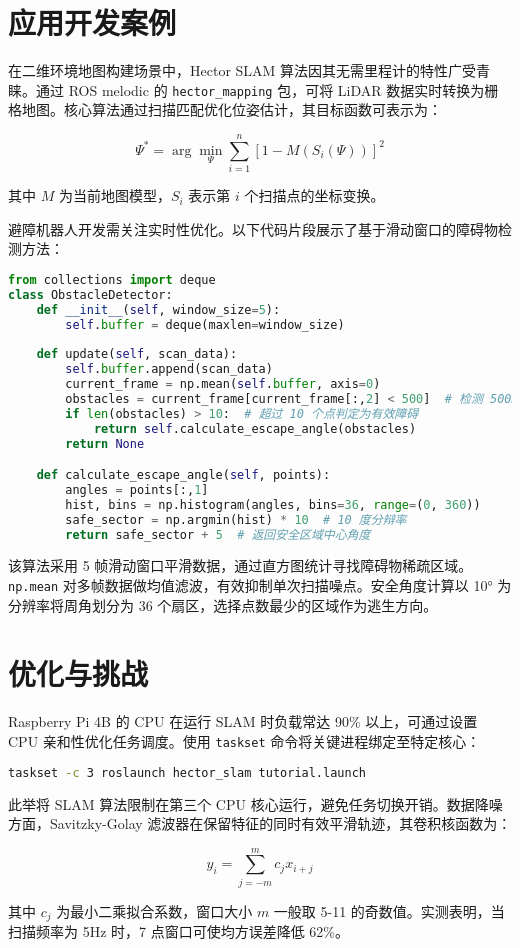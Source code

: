 \chapter{应用开发案例}
在二维环境地图构建场景中，Hector SLAM 算法因其无需里程计的特性广受青睐。通过 ROS melodic 的 \verb!hector_mapping! 包，可将 LiDAR 数据实时转换为栅格地图。核心算法通过扫描匹配优化位姿估计，其目标函数可表示为：\par
$$\Psi^* = \arg\min_{\Psi}\sum_{i=1}^{n}[1 - M(S_i(\Psi))]^2$$\par
其中 $M$ 为当前地图模型，$S_i$ 表示第 $i$ 个扫描点的坐标变换。\par
避障机器人开发需关注实时性优化。以下代码片段展示了基于滑动窗口的障碍物检测方法：\par
\begin{lstlisting}[language=python]
from collections import deque
class ObstacleDetector:
    def __init__(self, window_size=5):
        self.buffer = deque(maxlen=window_size)
    
    def update(self, scan_data):
        self.buffer.append(scan_data)
        current_frame = np.mean(self.buffer, axis=0)
        obstacles = current_frame[current_frame[:,2] < 500]  # 检测 500mm 内障碍物
        if len(obstacles) > 10:  # 超过 10 个点判定为有效障碍
            return self.calculate_escape_angle(obstacles)
        return None

    def calculate_escape_angle(self, points):
        angles = points[:,1]
        hist, bins = np.histogram(angles, bins=36, range=(0, 360))
        safe_sector = np.argmin(hist) * 10  # 10 度分辩率
        return safe_sector + 5  # 返回安全区域中心角度
\end{lstlisting}
该算法采用 5 帧滑动窗口平滑数据，通过直方图统计寻找障碍物稀疏区域。\verb!np.mean! 对多帧数据做均值滤波，有效抑制单次扫描噪点。安全角度计算以 10° 为分辨率将周角划分为 36 个扇区，选择点数最少的区域作为逃生方向。\par
\chapter{优化与挑战}
Raspberry Pi 4B 的 CPU 在运行 SLAM 时负载常达 90\%{} 以上，可通过设置 CPU 亲和性优化任务调度。使用 \verb!taskset! 命令将关键进程绑定至特定核心：\par
\begin{lstlisting}[language=bash]
taskset -c 3 roslaunch hector_slam tutorial.launch
\end{lstlisting}
此举将 SLAM 算法限制在第三个 CPU 核心运行，避免任务切换开销。数据降噪方面，Savitzky-Golay 滤波器在保留特征的同时有效平滑轨迹，其卷积核函数为：\par
$$y_i = \sum_{j=-m}^{m} c_j x_{i+j}$$\par
其中 $c_j$ 为最小二乘拟合系数，窗口大小 $m$ 一般取 5-11 的奇数值。实测表明，当扫描频率为 5Hz 时，7 点窗口可使均方误差降低 62\%{}。\par
